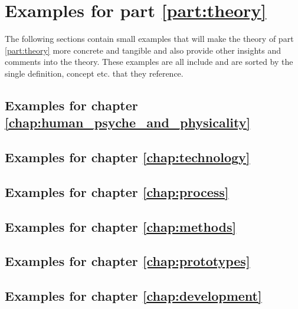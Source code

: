 \chapter{Examples for part \ref{part:theory}} \label{chap:theory_examples}
The following sections contain small examples that will make the theory of part \ref{part:theory} more concrete and tangible and also provide other insights and comments into the theory. These examples are all include and are sorted by the single definition, concept etc. that they reference.

\vfill \minitoc \newpage

\section{Examples for chapter \ref{chap:human_psyche_and_physicality}} \label{chap:human_psyche_and_physicality_examples}

\section{Examples for chapter \ref{chap:technology}} \label{chap:technology_examples}

\section{Examples for chapter \ref{chap:process}} \label{chap:process_examples}

\section{Examples for chapter \ref{chap:methods}} \label{chap:methods_examples}

\section{Examples for chapter \ref{chap:prototypes}} \label{chap:prototypes_examples}

\section{Examples for chapter \ref{chap:development}} \label{chap:development_examples}


